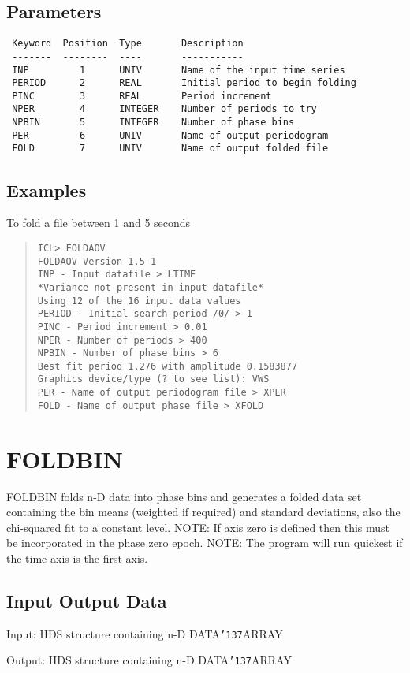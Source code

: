 \documentclass{book}
\renewcommand{\_}{{\tt\char'137}}     %
\begin{document}
\subsection{Parameters}
\begin{verbatim}
 Keyword  Position  Type       Description
 -------  --------  ----       -----------
 INP         1      UNIV       Name of the input time series
 PERIOD      2      REAL       Initial period to begin folding
 PINC        3      REAL       Period increment
 NPER        4      INTEGER    Number of periods to try
 NPBIN       5      INTEGER    Number of phase bins
 PER         6      UNIV       Name of output periodogram
 FOLD        7      UNIV       Name of output folded file

\end{verbatim}\subsection{Examples}
To fold a file between 1 and 5 seconds
\begin{quote}\begin{verbatim}
ICL> FOLDAOV
FOLDAOV Version 1.5-1
INP - Input datafile > LTIME
*Variance not present in input datafile*
Using 12 of the 16 input data values
PERIOD - Initial search period /0/ > 1
PINC - Period increment > 0.01
NPER - Number of periods > 400
NPBIN - Number of phase bins > 6
Best fit period 1.276 with amplitude 0.1583877
Graphics device/type (? to see list): VWS
PER - Name of output periodogram file > XPER
FOLD - Name of output phase file > XFOLD
\end{verbatim}\end{quote}
\section{FOLDBIN}
FOLDBIN folds n-D data into phase bins and generates a folded data
set containing the bin means (weighted if required) and standard
deviations, also the chi-squared fit to a constant level.
NOTE: If axis zero is defined then this must be
incorporated in the phase zero epoch.
NOTE: The program will run quickest if the
time axis is the first axis.
\subsection{Input Output Data}
Input: HDS structure containing n-D DATA\_ARRAY

Output: HDS structure containing n-D DATA\_ARRAY
\end{document}
